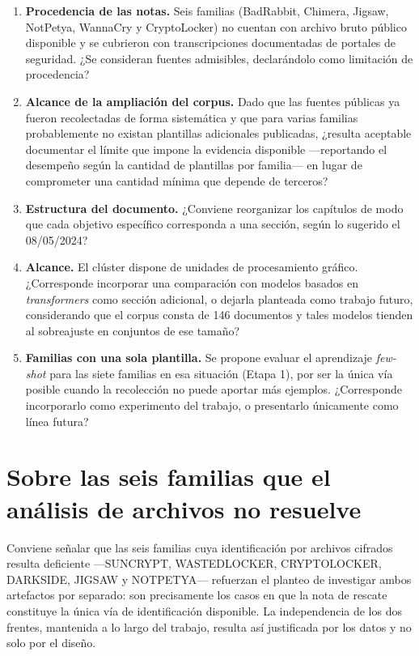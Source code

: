 \documentclass[11pt,a4paper]{article}
\begin{document}
\begin{enumerate}[label=\alph*)]
\item \textbf{Procedencia de las notas.} Seis familias (BadRabbit, Chimera, Jigsaw, NotPetya,
WannaCry y CryptoLocker) no cuentan con archivo bruto público disponible y se cubrieron con
transcripciones documentadas de portales de seguridad. ¿Se consideran fuentes admisibles,
declarándolo como limitación de procedencia?
\item \textbf{Alcance de la ampliación del corpus.} Dado que las fuentes públicas ya fueron
recolectadas de forma sistemática y que para varias familias probablemente no existan
plantillas adicionales publicadas, ¿resulta aceptable documentar el límite que impone la
evidencia disponible ---reportando el desempeño según la cantidad de plantillas por familia---
en lugar de comprometer una cantidad mínima que depende de terceros?
\item \textbf{Estructura del documento.} ¿Conviene reorganizar los capítulos de modo que cada
objetivo específico corresponda a una sección, según lo sugerido el 08/05/2024?
\item \textbf{Alcance.} El clúster dispone de unidades de procesamiento gráfico. ¿Corresponde
incorporar una comparación con modelos basados en \textit{transformers} como sección
adicional, o dejarla planteada como trabajo futuro, considerando que el corpus consta de 146
documentos y tales modelos tienden al sobreajuste en conjuntos de ese tamaño?
\item \textbf{Familias con una sola plantilla.} Se propone evaluar el aprendizaje
\textit{few-shot} para las siete familias en esa situación (Etapa 1), por ser la única vía
posible cuando la recolección no puede aportar más ejemplos. ¿Corresponde incorporarlo como
experimento del trabajo, o presentarlo únicamente como línea futura?
\end{enumerate}

\section*{Sobre las seis familias que el análisis de archivos no resuelve}

Conviene señalar que las seis familias cuya identificación por archivos cifrados resulta
deficiente ---SUNCRYPT, WASTEDLOCKER, CRYPTOLOCKER, DARKSIDE, JIGSAW y NOTPETYA--- refuerzan
el planteo de investigar ambos artefactos por separado: son precisamente los casos en que la
nota de rescate constituye la única vía de identificación disponible. La independencia de los
dos frentes, mantenida a lo largo del trabajo, resulta así justificada por los datos y no
solo por el diseño.
\end{document}
